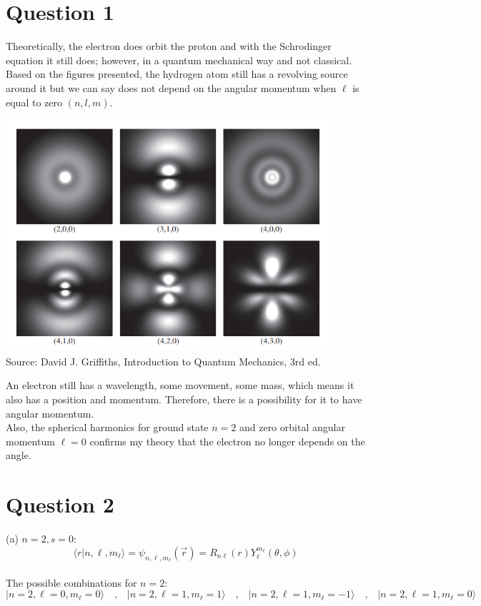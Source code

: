 \documentclass[11pt]{article}
\def\l{\ell}
\def\la{\langle}
\def\ra{\rangle}
\theoremstyle{pink}
\theoremstyle{boxedsolution}
\theoremstyle{definition}
\theoremstyle{claim}
\begin{document}
\section*{Question 1}
Theoretically, the electron does orbit the proton and with the Schrodinger equation it still does; however, in a quantum mechanical way and not classical. Based on the figures presented, the hydrogen atom still has a revolving source around it but we can say does not depend on the angular momentum when $\l$ is equal to zero $(n,l,m)$.
\begin{center}
    \includegraphics[width=12cm]{h.png}\\
    Source: David J. Griffiths, Introduction to Quantum Mechanics, 3rd ed.
\end{center}
An electron still has a wavelength, some movement, some mass, which means it also has a position and momentum. Therefore, there is a possibility for it to have angular momentum.\\
Also, the spherical harmonics for ground state $n=2$ and zero orbital angular momentum $\l = 0$ confirms my theory that the electron no longer depends on the angle.

\newpage
\section*{Question 2}
(a) $n = 2, s = 0$:
\[\la r|n,\l,m_\l\ra=\psi_{n,\l,m_\l}(\Vec{r})=R_{n\l}(r)Y^{m_\l}_\l(\theta, \phi)\]
\vspace{3mm}
\\The possible combinations for $n=2$:
\[\Big|n = 2,\l = 0,m_\l=0\Big\ra \text { } \text { , } \text { } \Big|n = 2,\l = 1,m_\l=1\Big\ra  \text { } \text { , } \text { }  \Big|n = 2,\l = 1,m_\l= -1\Big\ra  \text { } \text { , } \text { }  \Big|n = 2,\l = 1,m_\l=0\Big\ra\]
\end{document}
